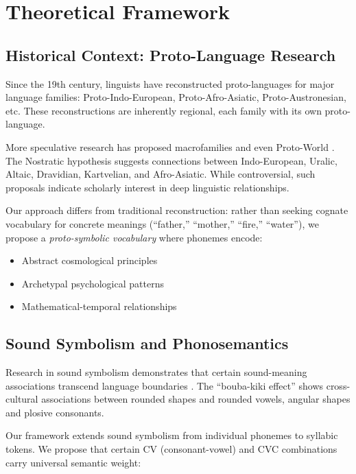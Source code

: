 \documentclass[12pt,a4paper]{article}
\begin{document}
\section{Theoretical Framework}

\subsection{Historical Context: Proto-Language Research}

Since the 19th century, linguists have reconstructed proto-languages for major language families: Proto-Indo-European, Proto-Afro-Asiatic, Proto-Austronesian, etc. These reconstructions are inherently regional, each family with its own proto-language.

More speculative research has proposed macrofamilies and even Proto-World \citep{ruhlen1994}. The Nostratic hypothesis \citep{bomhard2008} suggests connections between Indo-European, Uralic, Altaic, Dravidian, Kartvelian, and Afro-Asiatic. While controversial, such proposals indicate scholarly interest in deep linguistic relationships.

Our approach differs from traditional reconstruction: rather than seeking cognate vocabulary for concrete meanings (``father,'' ``mother,'' ``fire,'' ``water''), we propose a \textit{proto-symbolic vocabulary} where phonemes encode:

\begin{itemize}
    \item Abstract cosmological principles
    \item Archetypal psychological patterns
    \item Mathematical-temporal relationships
\end{itemize}

\subsection{Sound Symbolism and Phonosemantics}

Research in sound symbolism demonstrates that certain sound-meaning associations transcend language boundaries \citep{hinton1994}. The ``bouba-kiki effect'' shows cross-cultural associations between rounded shapes and rounded vowels, angular shapes and plosive consonants.

Our framework extends sound symbolism from individual phonemes to syllabic tokens. We propose that certain CV (consonant-vowel) and CVC combinations carry universal semantic weight:
\end{document}
